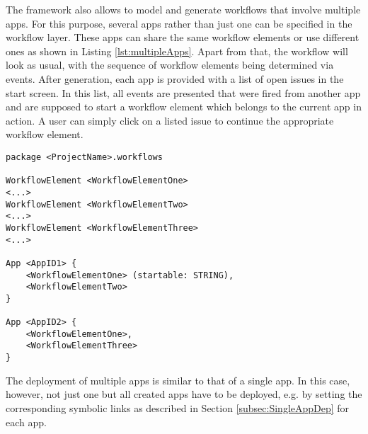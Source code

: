 
The \MD framework also allows to model and generate workflows that involve multiple apps. For this purpose, several apps rather than just one can be specified in the workflow layer. These apps can share the same workflow elements or use different ones as shown in Listing \ref{lst:multipleApps}. Apart from that, the workflow will look as usual, with the sequence of workflow elements being determined via events. After generation, each app is provided with a list of open issues in the start screen. In this list, all events are presented that were fired from another app and are supposed to start a workflow element which belongs to the current app in action. A user can simply click on a listed issue to continue the appropriate workflow element.

\begin{lstlisting}[language=MD2, label=lst:multipleApps, caption=Workflow Definition for Multiple Apps]
package <ProjectName>.workflows

WorkflowElement <WorkflowElementOne>
<...>
WorkflowElement <WorkflowElementTwo>
<...>
WorkflowElement <WorkflowElementThree>
<...>

App <AppID1> {
	<WorkflowElementOne> (startable: STRING),
	<WorkflowElementTwo>
}

App <AppID2> {
	<WorkflowElementOne>,
	<WorkflowElementThree>
}
\end{lstlisting}

The deployment of multiple apps is similar to that of a single app. In this case, however, not just one but all created apps have to be deployed, e.g. by setting the corresponding symbolic links as described in Section \ref{subsec:SingleAppDep} for each app.
